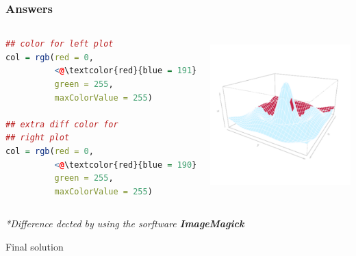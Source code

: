 \documentclass{beamer}
\begin{document}
\begin{frame}[fragile]
\frametitle{Answers}

\begin{columns}

\begin{lstlisting}[language = R]
## color for left plot
col = rgb(red = 0, 
          <@\textcolor{red}{blue = 191}@>, 
          green = 255,
          maxColorValue = 255)
      
## extra diff color for 
## right plot
col = rgb(red = 0, 
          <@\textcolor{red}{blue = 190}@>, 
          green = 255, 
          maxColorValue = 255)

\end{lstlisting}

\begin{center}
\includegraphics[height = 6cm, width = 6cm]{plot/persp_diff_3.pdf}
\end{center}

\end{columns}

\hfill \textit{*Difference dected by using the sorftware \textbf{ImageMagick}}

\end{frame}




\begin{frame}
\begin{center}
\Huge Final solution
\end{center}
\end{frame}
\end{document}
